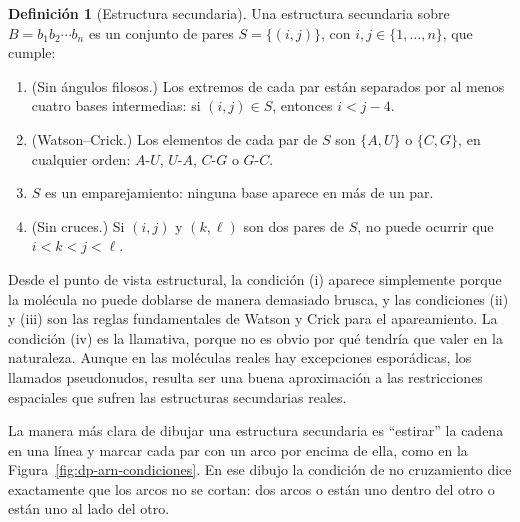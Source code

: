 \documentclass[12pt, spanish, oneside, openany]{book}
\theoremstyle{uprightplain}
\theoremstyle{definition}
\newtheorem{definicion}[teorema]{Definición}
\theoremstyle{remark}
\theoremstyle{definition}
\begin{document}
\begin{definicion}[Estructura secundaria]
\label{def:dp-estructura-secundaria}
Una estructura secundaria sobre $B=b_1b_2\cdots b_n$ es un conjunto de pares $S=\{(i,j)\}$, con $i,j\in\{1,\dots,n\}$, que cumple:
\begin{enumerate}[label=(\roman*)]
    \item (Sin ángulos filosos.) Los extremos de cada par están separados por al menos cuatro bases intermedias: si $(i,j)\in S$, entonces $i<j-4$.
    \item (Watson--Crick.) Los elementos de cada par de $S$ son $\{A,U\}$ o $\{C,G\}$, en cualquier orden: $A$-$U$, $U$-$A$, $C$-$G$ o $G$-$C$.
    \item $S$ es un emparejamiento: ninguna base aparece en más de un par.
    \item (Sin cruces.) Si $(i,j)$ y $(k,\ell)$ son dos pares de $S$, no puede ocurrir que $i<k<j<\ell$.
\end{enumerate}
\end{definicion}

Desde el punto de vista estructural, la condición (i) aparece simplemente porque la molécula no puede doblarse de manera demasiado brusca, y las condiciones (ii) y (iii) son las reglas fundamentales de Watson y Crick para el apareamiento. La condición (iv) es la llamativa, porque no es obvio por qué tendría que valer en la naturaleza. Aunque en las moléculas reales hay excepciones esporádicas, los llamados pseudonudos, resulta ser una buena aproximación a las restricciones espaciales que sufren las estructuras secundarias reales.

La manera más clara de dibujar una estructura secundaria es ``estirar'' la cadena en una línea y marcar cada par con un arco por encima de ella, como en la Figura~\ref{fig:dp-arn-condiciones}. En ese dibujo la condición de no cruzamiento dice exactamente que los arcos no se cortan: dos arcos o están uno dentro del otro o están uno al lado del otro.
\end{document}
